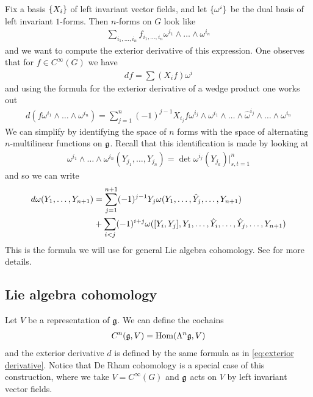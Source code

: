 \documentclass[12pt]{article}
\begin{document}
Fix a basis $\{X_i\}$ of left invariant vector fields, and let $\{\omega^i\}$ be the dual basis of left invariant $1$-forms.
Then $n$-forms on $G$ look like \begin{align*}
    \sum_{i_1,\dots,i_n}f_{i_1,\dots,i_n}\omega^{i_1}\wedge\dots\wedge\omega^{i_n}
\end{align*} and we want to compute the exterior derivative of this expression. One observes that for $f\in C^\infty(G)$ we have \begin{align*}
    df = \sum (X_if)\omega^i
\end{align*} and using the formula for the exterior derivative of a wedge product one works out \begin{align*}
    d(f \omega^{i_1}\wedge\dots\wedge\omega^{i_n}) = \sum_{j=1}^n (-1)^{j-1}X_{i_j}f\omega^{i_j}\wedge \omega^{i_1}\wedge\dots\wedge\hat\omega^{i_j}\wedge\dots\wedge\omega^{i_n}
\end{align*} We can simplify by identifying the space of $n$ forms with the space of alternating $n$-multilinear functions on $\mathfrak{g}$.
Recall that this identification is made by looking at
\begin{align*}
    \omega^{i_1} \wedge \dots \wedge \omega^{i_n}(Y_{j_1},\dots,Y_{j_n}) = \det{\omega^{i_j}(Y_{j_k})}\vert_{s,t=1}^n
\end{align*}
and so we can write 
\begin{align}
    d\omega(Y_1,\dots,Y_{n+1}) &= \sum_{j=1}^{n+1}(-1)^{j-1}Y_j\omega(Y_1,\dots,\hat Y_j,\dots,Y_{n+1}) \notag\\
    & + \sum_{i<j}(-1)^{i+j}\omega([Y_i,Y_j],Y_1,\dots,\hat Y_i,\dots,\hat Y_j,\dots,Y_{n+1})\label{eq:exterior derivative}
\end{align}
This is the formula we will use for general Lie algebra cohomology. See \cite{Knapp} for more details.

\subsection{Lie algebra cohomology}
Let $V$ be a representation of $\mathfrak{g}$. We can define the cochains \begin{align*}
    C^n(\mathfrak{g},V) = \operatorname{Hom}(\Lambda^n\mathfrak{g},V)
\end{align*} and the exterior derivative $d$ is defined by the same formula as in \eqref{eq:exterior derivative}.
Notice that De Rham cohomology is a special case of this construction, where we take $V = C^\infty(G)$ and $\mathfrak{g}$ acts on $V$ by left invariant vector fields.
\end{document}
